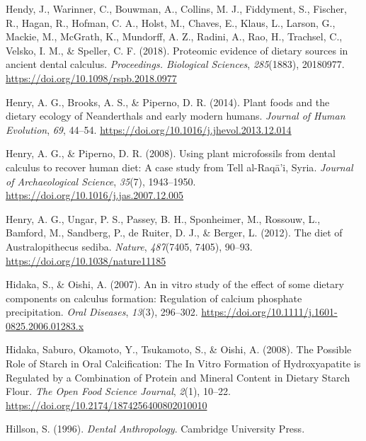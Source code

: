 \documentclass[
  letterpaper,
]{book}
\newlength{\cslhangindent}
\newlength{\cslentryspacingunit} %
\newenvironment{CSLReferences}[2] %
 {%
  \setlength{\parindent}{0pt}
  \ifodd #1
  \let\oldpar\par
  \def\par{\hangindent=\cslhangindent\oldpar}
  \fi
  \setlength{\parskip}{#2\cslentryspacingunit}
 }%
 {}
\begin{document}
\begin{CSLReferences}{1}{0}
\leavevmode{}%
Hendy, J., Warinner, C., Bouwman, A., Collins, M. J., Fiddyment, S.,
Fischer, R., Hagan, R., Hofman, C. A., Holst, M., Chaves, E., Klaus, L.,
Larson, G., Mackie, M., McGrath, K., Mundorff, A. Z., Radini, A., Rao,
H., Trachsel, C., Velsko, I. M., \& Speller, C. F. (2018). Proteomic
evidence of dietary sources in ancient dental calculus.
\emph{Proceedings. Biological Sciences}, \emph{285}(1883), 20180977.
\url{https://doi.org/10.1098/rspb.2018.0977}

\leavevmode{}%
Henry, A. G., Brooks, A. S., \& Piperno, D. R. (2014). Plant foods and
the dietary ecology of {Neanderthals} and early modern humans.
\emph{Journal of Human Evolution}, \emph{69}, 44--54.
\url{https://doi.org/10.1016/j.jhevol.2013.12.014}

\leavevmode{}%
Henry, A. G., \& Piperno, D. R. (2008). Using plant microfossils from
dental calculus to recover human diet: A case study from {Tell}
al-{Raqā}'i, {Syria}. \emph{Journal of Archaeological Science},
\emph{35}(7), 1943--1950.
\url{https://doi.org/10.1016/j.jas.2007.12.005}

\leavevmode{}%
Henry, A. G., Ungar, P. S., Passey, B. H., Sponheimer, M., Rossouw, L.,
Bamford, M., Sandberg, P., de Ruiter, D. J., \& Berger, L. (2012). The
diet of {Australopithecus} sediba. \emph{Nature}, \emph{487}(7405,
7405), 90--93. \url{https://doi.org/10.1038/nature11185}

\leavevmode{}%
Hidaka, S., \& Oishi, A. (2007). An in vitro study of the effect of some
dietary components on calculus formation: Regulation of calcium
phosphate precipitation. \emph{Oral Diseases}, \emph{13}(3), 296--302.
\url{https://doi.org/10.1111/j.1601-0825.2006.01283.x}

\leavevmode{}%
Hidaka, Saburo, Okamoto, Y., Tsukamoto, S., \& Oishi, A. (2008). The
{Possible Role} of {Starch} in {Oral Calcification}: {The In Vitro
Formation} of {Hydroxyapatite} is {Regulated} by a {Combination} of
{Protein} and {Mineral Content} in {Dietary Starch Flour}. \emph{The
Open Food Science Journal}, \emph{2}(1), 10--22.
\url{https://doi.org/10.2174/1874256400802010010}

\leavevmode{}%
Hillson, S. (1996). \emph{Dental {Anthropology}}. {Cambridge University
Press}.


\end{CSLReferences}
\end{document}
